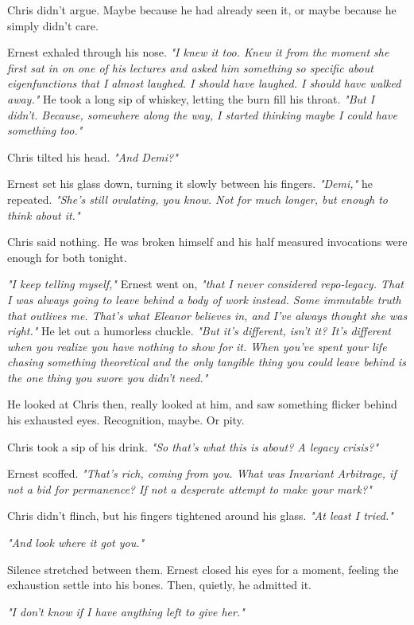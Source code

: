 Chris didn’t argue. Maybe because he had already seen it, or maybe because he simply didn’t care.

Ernest exhaled through his nose. \textit{"I knew it too. Knew it from the moment she first sat in on one of his lectures and asked him something so specific about eigenfunctions that I almost laughed. I should have laughed. I should have walked away."} He took a long sip of whiskey, letting the burn fill his throat. \textit{"But I didn't. Because, somewhere along the way, I started thinking maybe I could have something too."}

Chris tilted his head. \textit{"And Demi?"}

Ernest set his glass down, turning it slowly between his fingers. \textit{"Demi,"} he repeated. \textit{"She’s still ovulating, you know. Not for much longer, but enough to think about it."}

Chris said nothing. He was broken himself and his half measured invocations were enough for both tonight.

\textit{"I keep telling myself,"} Ernest went on, \textit{"that I never considered repo-legacy. That I was always going to leave behind a body of work instead. Some immutable truth that outlives me. That’s what Eleanor believes in, and I’ve always thought she was right."} He let out a humorless chuckle. \textit{"But it’s different, isn’t it? It’s different when you realize you have nothing to show for it. When you’ve spent your life chasing something theoretical and the only tangible thing you could leave behind is the one thing you swore you didn’t need."}

He looked at Chris then, really looked at him, and saw something flicker behind his exhausted eyes. Recognition, maybe. Or pity.

Chris took a sip of his drink. \textit{"So that’s what this is about? A legacy crisis?"}

Ernest scoffed. \textit{"That’s rich, coming from you. What was Invariant Arbitrage, if not a bid for permanence? If not a desperate attempt to make your mark?"}

Chris didn’t flinch, but his fingers tightened around his glass. \textit{"At least I tried."}

\textit{"And look where it got you."}

Silence stretched between them. Ernest closed his eyes for a moment, feeling the exhaustion settle into his bones. Then, quietly, he admitted it.

\textit{"I don't know if I have anything left to give her."}

